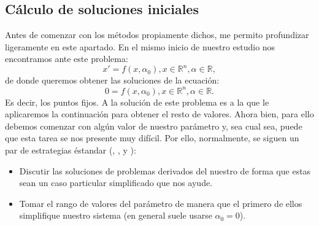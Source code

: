 \subsection{Cálculo de soluciones iniciales}
Antes de comenzar con los métodos propiamente dichos, me permito profundizar ligeramente en este apartado. En el mismo inicio de nuestro estudio nos encontramos ante este problema:
\begin{equation}
x'=f(x,\alpha_0), x\in\mathbb{R}^n, \alpha\in\mathbb{R},
\end{equation}
de donde queremos obtener las soluciones de la ecuación:
\begin{equation}
0=f(x,\alpha_0), x\in\mathbb{R}^n, \alpha\in\mathbb{R}.
\end{equation}
Es decir, los puntos fijos. A la solución de este problema es a la que le aplicaremos la continuación para obtener el resto de valores. Ahora bien, para ello debemos comenzar con algún valor de nuestro parámetro y, sea cual sea, puede que esta tarea se nos presente muy difícil. Por ello, normalmente, se siguen un par de estrategias éstandar (\cite{Lectures}, \cite{prac}, \cite{siam1} y \cite{graduate}):
\begin{itemize}
	\item Discutir las soluciones de problemas derivados del nuestro de forma que estas sean un caso particular simplificado que nos ayude.
	\item Tomar el rango de valores del parámetro de manera que el primero de ellos simplifique nuestro sistema (en general suele usarse $\alpha_0 =0$).
\end{itemize} 

